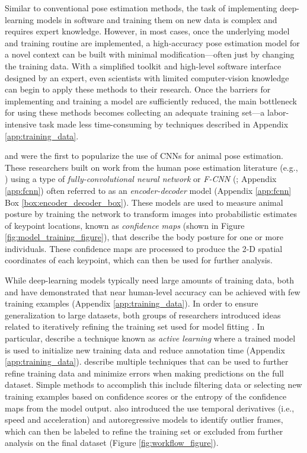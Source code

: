 \documentclass[11pt,a4paper,oneside]{book}
\begin{document}
\begin{doublespace}
Similar to conventional pose estimation methods, the task of implementing deep-learning models in software and training them on new data is complex and requires expert knowledge. However, in most cases, once the underlying model and training routine are implemented, a high-accuracy pose estimation model for a novel context can be built with minimal modification—often just by changing the training data. With a simplified toolkit and high-level software interface designed by an expert, even scientists with limited computer-vision knowledge can begin to apply these methods to their research. Once the barriers for implementing and training a model are sufficiently reduced, the main bottleneck for using these methods becomes collecting an adequate training set—a labor-intensive task made less time-consuming by techniques described in Appendix \ref{app:training_data}.

\cite{mathis2018deeplabcut} and \cite{pereira2019fast} were the first to popularize the use of CNNs for animal pose estimation. These researchers built on work from the human pose estimation literature (e.g., \citealt{andriluka14cvpr,insafutdinov2016deepercut,newell2016}) using a type of \textit{fully-convolutional neural network} or \textit{F-CNN} (\citealt{long2015fully}; Appendix \ref{app:fcnn}) often referred to as an \textit{encoder-decoder} model (Appendix \ref{app:fcnn} Box \ref{box:encoder_decoder_box}). These models are used to measure animal posture by training the network to transform images into probabilistic estimates of keypoint locations, known as \textit{confidence maps} (shown in Figure \ref{fig:model_training_figure}), that describe the body posture for one or more individuals. These confidence maps are processed to produce the 2-D spatial coordinates of each keypoint, which can then be used for further analysis. 

While deep-learning models typically need large amounts of training data, both \cite{mathis2018deeplabcut} and \cite{pereira2019fast} have demonstrated that near human-level accuracy can be achieved with few training examples (Appendix \ref{app:training_data}). In order to ensure generalization to large datasets, both groups of researchers introduced ideas related to iteratively refining the training set used for model fitting \citep{mathis2018deeplabcut, pereira2019fast}. In particular, \cite{pereira2019fast} describe a technique known as \textit{active learning} where a trained model is used to initialize new training data and reduce annotation time (Appendix \ref{app:training_data}). \cite{mathis2018deeplabcut} describe multiple techniques that can be used to further refine training data and minimize errors when making predictions on the full dataset. Simple methods to accomplish this include filtering data or selecting new training examples based on confidence scores or the entropy of the confidence maps from the model output. \cite{nath2018} also introduced the use temporal derivatives (i.e., speed and acceleration) and autoregressive models to identify outlier frames, which can then be labeled to refine the training set or excluded from further analysis on the final dataset (Figure \ref{fig:workflow_figure}).


\end{doublespace}
\end{document}
